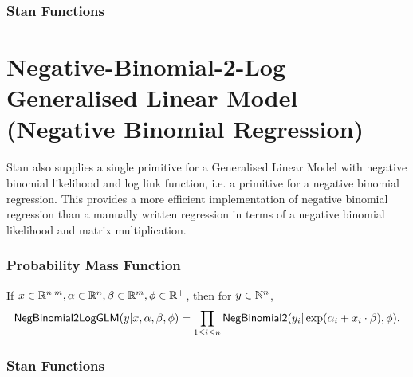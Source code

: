 
\subsubsection{Stan Functions}

\begin{description}
%
%
%
\end{description}

\section{Negative-Binomial-2-Log Generalised Linear Model (Negative Binomial
Regression)}
\label{neg-binom-2-log-glm.section}

Stan also supplies a single primitive for a Generalised Linear Model with
negative binomial likelihood and log link function, i.e. a primitive for a
negative binomial regression.
This provides a more efficient implementation of negative binomial regression
than a manually written regression in terms of a negative binomial likelihood
and matrix multiplication.

\subsubsection{Probability Mass Function}

If $x\in \mathbb{R}^{n\cdot m}, \alpha \in \mathbb{R}^n, \beta\in \mathbb{R}^m,
\phi\in \mathbb{R}^+$, then for
$y \in \mathbb{N}^n$,
\[
\mbox{\sf NegBinomial2LogGLM}(y|x, \alpha, \beta, \phi)
=
\prod_{1\leq i \leq n}\mbox{\sf NegBinomial2}(y_i|\exp(\alpha_i +
x_i\cdot \beta), \phi).
\]


\subsubsection{Stan Functions}

